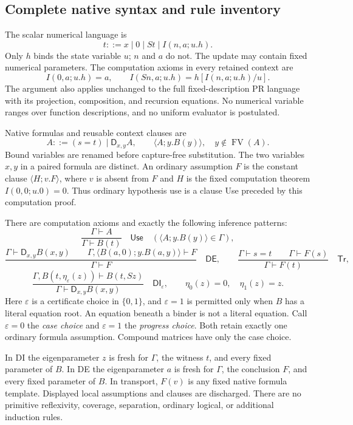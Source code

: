 \documentclass[11pt,letterpaper]{article}
\theoremstyle{definition}\newtheorem{definition}[theorem]{Definition}
\theoremstyle{remark}\newtheorem{remark}[theorem]{Remark}
\begin{document}
\subsection{Complete native syntax and rule inventory}

The scalar numerical language is
\[
 t::=x\mid0\mid St\mid I(n,a;u.h).
\]
Only $h$ binds the state variable $u$; $n$ and $a$ do not.
The update may contain fixed numerical parameters. The computation
axioms in every retained context are
\[
 I(0,a;u.h)=a,\qquad
 I(Sn,a;u.h)=h[I(n,a;u.h)/u].
 \tag{I0, IS}\label{eq:choice-computations}
\]
The argument also applies unchanged to the full fixed-description PR
language with its projection, composition, and recursion equations.
No numerical variable ranges over function descriptions, and no uniform
evaluator is postulated.

Native formulas and reusable context clauses are
\[
 A::=(s=t)\mid\mathsf D_{x,y}A,\qquad
 \langle A;y.B(y)\rangle,\quad y\notin\operatorname{FV}(A).
\]
Bound variables are renamed before capture-free substitution.
The two variables $x,y$ in a paired formula are distinct.
An ordinary assumption $F$ is the constant clause
$\langle H;v.F\rangle$, where $v$ is absent from $F$ and $H$ is the
fixed computation theorem $I(0,0;u.0)=0$. Thus ordinary hypothesis
use is a clause Use preceded by this computation proof.

There are computation axioms and exactly the following inference
patterns:
\[
\frac{\Gamma\vdash A}{\Gamma\vdash B(t)}
\quad\mathsf{Use}
\quad(\langle A;y.B(y)\rangle\in\Gamma),
\]
\[
\frac{\Gamma\vdash\mathsf D_{x,y}B(x,y)\qquad
      \Gamma,\langle B(a,0);y.B(a,y)\rangle\vdash F}
     {\Gamma\vdash F}
\quad\mathsf{DE},
\qquad
\frac{\Gamma\vdash s=t\qquad\Gamma\vdash F(s)}
     {\Gamma\vdash F(t)}
\quad\mathsf{Tr},
\]
\[
\frac{\Gamma,B(t,\eta_\varepsilon(z))\vdash B(t,Sz)}
     {\Gamma\vdash\mathsf D_{x,y}B(x,y)}
\quad\mathsf{DI}_{\varepsilon},
\qquad
\eta_0(z)=0,\quad\eta_1(z)=z.
\tag{Choice DI}\label{eq:choice-di}
\]
Here $\varepsilon$ is a certificate choice in $\{0,1\}$, and
$\varepsilon=1$ is permitted only when $B$ has a literal equation
root. An equation beneath a binder is not a literal equation.
Call $\varepsilon=0$ the \emph{case choice} and $\varepsilon=1$
the \emph{progress choice}. Both retain exactly one ordinary
formula assumption. Compound matrices have only the case choice.

In DI the eigenparameter $z$ is fresh for $\Gamma$, the witness
$t$, and every fixed parameter of $B$. In DE the eigenparameter
$a$ is fresh for $\Gamma$, the conclusion $F$, and every fixed
parameter of $B$. In transport, $F(v)$ is any fixed native
formula template. Displayed local assumptions and clauses are
discharged. There are no primitive reflexivity, coverage,
separation, ordinary logical, or additional induction rules.
\end{document}
